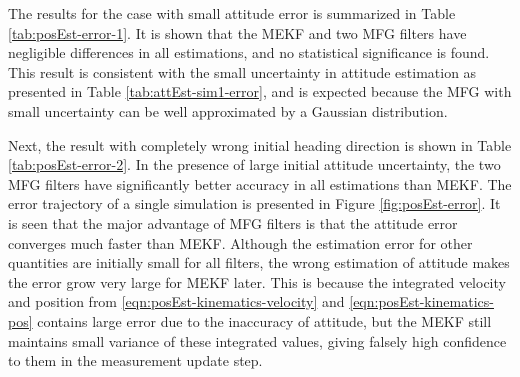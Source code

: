 The results for the case with small attitude error is summarized in Table \ref{tab:posEst-error-1}.
It is shown that the MEKF and two MFG filters have negligible differences in all estimations, and no statistical significance is found.
This result is consistent with the small uncertainty in attitude estimation as presented in Table \ref{tab:attEst-sim1-error}, and is expected because the MFG with small uncertainty can be well approximated by a Gaussian distribution.

Next, the result with completely wrong initial heading direction is shown in Table \ref{tab:posEst-error-2}.
In the presence of large initial attitude uncertainty, the two MFG filters have significantly better accuracy in all estimations than MEKF.
The error trajectory of a single simulation is presented in Figure \ref{fig:posEst-error}.
It is seen that the major advantage of MFG filters is that the attitude error converges much faster than MEKF.
Although the estimation error for other quantities are initially small for all filters, the wrong estimation of attitude makes the error grow very large for MEKF later.
This is because the integrated velocity and position from \eqref{eqn:posEst-kinematics-velocity} and \eqref{eqn:posEst-kinematics-pos} contains large error due to the inaccuracy of attitude, but the MEKF still maintains small variance of these integrated values, giving falsely high confidence to them in the measurement update step.

